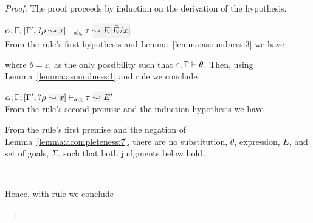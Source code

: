 \begin{proof}
The proof proceeds by induction on the derivation of the hypothesis.
\begin{description}
\setlength{\itemsep}{1em}
\item[\fbox{\rref{Alg-L-Match}}]\quad$\adlres{\bar\alpha}{\tenv}{\tenv',\envi{\rulet}{x}}{\type}{E[\bar{E}/\bar{x}]}$\ \\

From the rule's first hypothesis and Lemma~\ref{lemma:asoundness:3} we have
\begin{myequation*}
\end{myequation*}
where \(\theta = \varepsilon\), as the only possibility such that
\({\varepsilon; \Gamma \vdash \theta}\).
Then, using Lemma~\ref{lemma:asoundness:1} and rule  we conclude
\begin{myequation*}
\end{myequation*}

\item[\fbox{\rref{Alg-L-NoMatch}}]\quad
$\adlres{\bar\alpha}{\tenv}{\tenv',\envi{\rulet}{x}}{\type}{E'}$\ \\

  From the rule's second premise and the induction hypothesis we have
\begin{myequation*}
\end{myequation*}
From the rule's first premise and the negation of Lemma~\ref{lemma:acompleteness:7}, there are
no substitution, \(\theta\), expression, \(E\), and set of goals, \(\Sigma\), such that
both judgments below hold.
\begin{myequation*}
\validsubst{\bar\alpha}{\tenv}{\theta}~~~~~~~~
\end{myequation*}
  Hence, with rule  we conclude
\begin{myequation*}
\end{myequation*}


\end{description}
\end{proof}
